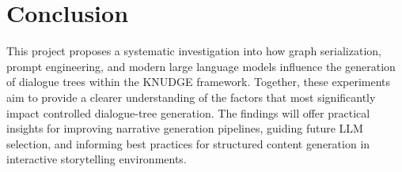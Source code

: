 \documentclass[12pt,a4paper]{article}
\begin{document}
\section{Conclusion}
This project proposes a systematic investigation into how graph serialization, prompt engineering, and modern large language models influence the generation of dialogue trees within the KNUDGE framework. Together, these experiments aim to provide a clearer understanding of the factors that most significantly impact controlled dialogue-tree generation. The findings will offer practical insights for improving narrative generation pipelines, guiding future LLM selection, and informing best practices for structured content generation in interactive storytelling environments.

\printbibliography[title={References}]
\end{document}
